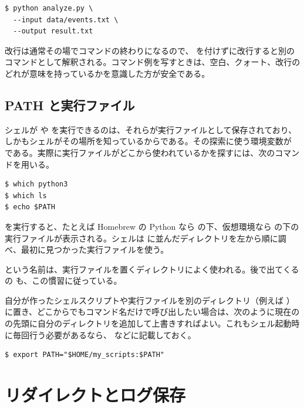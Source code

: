\begin{lstlisting}[numbers=none, xleftmargin=2\zw]
$ python analyze.py \
  --input data/events.txt \
  --output result.txt
\end{lstlisting}

改行は通常その場でコマンドの終わりになるので、\code{\textbackslash} を付けずに改行すると別のコマンドとして解釈される。コマンド例を写すときは、空白、クォート、改行のどれが意味を持っているかを意識した方が安全である。

\subsection{PATH と実行ファイル}

シェルが  や  を実行できるのは、それらが実行ファイルとして保存されており、しかもシェルがその場所を知っているからである。その探索に使う環境変数が  である。実際に実行ファイルがどこから使われているかを探すには、次のコマンドを用いる。

\begin{lstlisting}[numbers=none, xleftmargin=2\zw]
$ which python3
$ which ls
$ echo $PATH
\end{lstlisting}

 を実行すると、たとえば Homebrew の Python なら  の下、仮想環境なら  の下の実行ファイルが表示される。シェルは  に並んだディレクトリを左から順に調べ、最初に見つかった実行ファイルを使う。

\code{bin} という名前は、実行ファイルを置くディレクトリによく使われる。後で出てくる \code{.venv/bin} の \code{bin} も、この慣習に従っている。

自分が作ったシェルスクリプトや実行ファイルを別のディレクトリ（例えば \code{\textasciitilde/my\_scripts}）に置き、どこからでもコマンド名だけで呼び出したい場合は、次のように現在の  の先頭に自分のディレクトリを追加して上書きすればよい。これもシェル起動時に毎回行う必要があるなら、 などに記載しておく。

\begin{lstlisting}[numbers=none, xleftmargin=2\zw]
$ export PATH="$HOME/my_scripts:$PATH"
\end{lstlisting}

\section{リダイレクトとログ保存}

